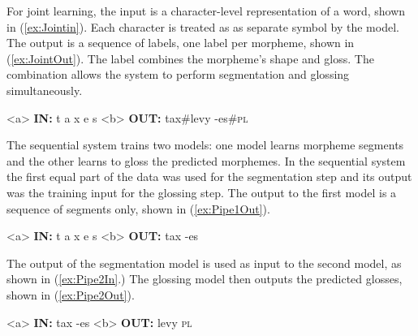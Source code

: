 For joint learning, the input is a character-level representation of a word, shown in (\ref{ex:Jointin}). Each character is treated as as separate symbol by the model. The output is a sequence of labels, one label per morpheme, shown in (\ref{ex:JointOut}). The label combines the morpheme's shape and gloss. The combination allows the system to perform segmentation and glossing simultaneously. 

\pex   
\label{ex:JointInOut}
\a<a> \textbf{IN:} \hspace{6 mm} t \hspace{2 mm} a \hspace{2 mm} x \hspace{2 mm} e \hspace{2 mm} s 
\label{ex:Jointin}
\a<b> \textbf{OUT:} \hspace{2 mm} tax\#levy \hspace{3 mm} -es\#\textsc{pl} 
\label{ex:JointOut}
\xe

The sequential system trains two models: one model learns morpheme segments and the other learns to gloss the predicted morphemes. In the sequential system the first equal part of the data was used for the segmentation step and its output was the training input for the glossing step. The output to the first model is a sequence of segments only, shown in (\ref{ex:Pipe1Out}). 

\pex  
\label{ex:Pipe1InOut}
\a<a> \textbf{IN:} \hspace{6 mm} t \hspace{2 mm} a \hspace{2 mm} x \hspace{2 mm} e \hspace{2 mm} s 
\label{ex:Pipe1in}
\a<b> \textbf{OUT:} \hspace{2 mm} tax \hspace{3 mm} -es
\label{ex:Pipe1Out}
\xe

The output of the segmentation model is used as input to the second model, as shown in (\ref{ex:Pipe2In}.) The glossing model then outputs the predicted glosses, shown in (\ref{ex:Pipe2Out}). 

\pex  
\label{ex:Pipe2InOut}
\a<a> \textbf{IN:} \hspace{6 mm} tax \hspace{3 mm} -es
\label{ex:Pipe2In}
\a<b> \textbf{OUT:} \hspace{2 mm} levy \hspace{2 mm} \textsc{pl}
\label{ex:Pipe2Out}
\xe

